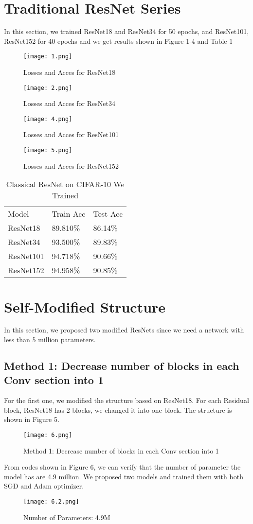 \documentclass[letterpaper]{article} %
\begin{document}
\section{Traditional ResNet Series}
In this section, we trained ResNet18 and ResNet34 for 50 epochs, and ResNet101, ResNet152 for 40 epochs and we get results shown in Figure 1-4 and Table 1
\begin{figure}
	\centering
	\texttt{[image: 1.png]}
	\caption{Losses and Acces for ResNet18}
\end{figure}
\begin{figure}
	\centering
	\texttt{[image: 2.png]}
	\caption{Losses and Acces for ResNet34}
\end{figure}
\begin{figure}
	\centering
	\texttt{[image: 4.png]}
	\caption{Losses and Acces for ResNet101}
\end{figure}
\begin{figure}
	\centering
	\texttt{[image: 5.png]}
	\caption{Losses and Acces for ResNet152}
\end{figure}
\begin{table}[t]
	\centering
	\begin{tabular}{l|l|l}
    Model & Train Acc & Test Acc\\
    ResNet18  & 89.810\%  & 86.14\%  \\
    ResNet34  & 93.500\%  & 89.83\%  \\
    ResNet101  & 94.718\%  & 90.66\%  \\
    ResNet152  & 94.958\%  & 90.85\%  \\
	\end{tabular}
	\caption{Classical ResNet on CIFAR-10 We Trained}
\end{table}

\section{Self-Modified Structure}
In this section, we proposed two modified ResNets since we need a network with less than 5 million parameters. 
\subsection{Method 1: Decrease number of blocks in each Conv section into 1}
For the first one, we modified the structure based on ResNet18. For each Residual block, ResNet18 has 2 blocks, we changed it into one block. The structure is shown in Figure 5. 
\begin{figure}[H]
	\centering
	\texttt{[image: 6.png]}
	\caption{Method 1: Decrease number of blocks in each Conv section into 1}
\end{figure}
From codes shown in Figure 6, we can verify that the  number of parameter the model has are 4.9 million. We proposed two models and trained them with both SGD and Adam optimizer.
\begin{figure}[H]
	\centering
	\texttt{[image: 6.2.png]}
	\caption{Number of Parameters: 4.9M}
\end{figure}
\end{document}
